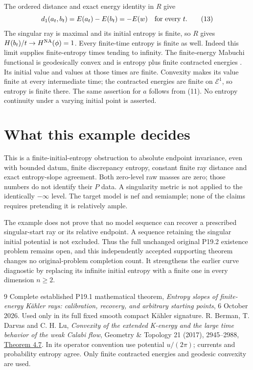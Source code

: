 \documentclass[10pt]{article}
\begin{document}
The ordered distance and exact energy identity in $R$ give
\[
 d_1(a_t,b_t)=E(a_t)-E(b_t)=-E(w)\quad\hbox{for every }t.          \tag{13}
\]
The singular ray is maximal and its initial entropy is finite, so
$R$ gives $H(b_t)/t\to H^{\rm NA}(\phi)=1$.
Every finite-time entropy is finite as well. Indeed this limit
supplies finite-entropy times tending to infinity. The finite-energy
Mabuchi functional is geodesically convex and is entropy plus
finite contracted energies \cite{BDL}. Its initial value and values
at those times are finite. Convexity makes its value finite at every
intermediate time; the contracted energies are finite on $\mathcal E^1$,
so entropy is finite there. The same assertion for $a$ follows from
(11). No entropy continuity under a varying initial point is asserted.

\section{What this example decides}
This is a finite-initial-entropy obstruction to absolute endpoint
invariance, even with bounded datum, finite discrepancy entropy,
constant finite ray distance and exact entropy-slope agreement.
Both zero-level raw masses are zero; those numbers do not identify
their $P$ data. A singularity metric is not applied to the identically
$-\infty$ level. The target model is nef and semiample; none of the
claims requires pretending it is relatively ample.

The example does not prove that no model sequence can recover a
prescribed singular-start ray or its relative endpoint. A sequence
retaining the singular initial potential is not excluded. Thus the
full unchanged original P19.2 existence problem remains open, and
this independently accepted supporting theorem changes no
original-problem completion count.
It strengthens the earlier curve diagnostic by replacing its
infinite initial entropy with a finite one in every dimension $n\geq2$.

\begin{thebibliography}{9}
 Complete established P19.1 mathematical theorem,
\emph{Entropy slopes of finite-energy K\"ahler rays: calibration,
recovery, and arbitrary starting points}, 6 October 2026.
Used only in its full fixed smooth compact K\"ahler signature.
 R. Berman, T. Darvas and C. H. Lu,
\emph{Convexity of the extended K-energy and the large time behavior
of the weak Calabi flow}, Geometry \& Topology 21 (2017), 2945--2988,
\href{https://msp.org/gt/2017/21-5/gt-v21-n5-p08-s.pdf}{Theorem 4.7}.
In its operator convention use potential $u/(2\pi)$; currents and
probability entropy agree. Only finite contracted energies and
geodesic convexity are used.
\end{thebibliography}
\end{document}
